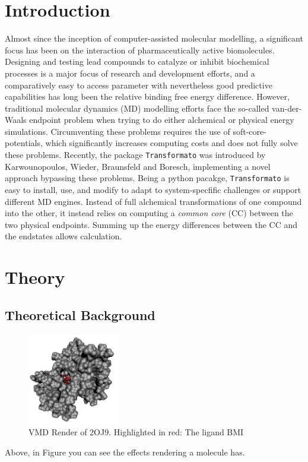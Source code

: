 \documentclass[oneside]{scrreprt}
\begin{document}
\chapter{Introduction}
Almost since the inception of computer-assisted molecular modelling, a significant focus has been on the interaction of pharmaceutically active biomolecules. Designing and testing lead compounds to catalyze or inhibit biochemical processes is a major focus of research and development efforts, and a comparatively easy to access parameter with nevertheless good predictive capabilities has long been the relative binding free energy difference. However, traditional molecular dynamics (MD) modelling efforts face the so-called van-der-Waals endpoint problem when trying to do either alchemical or physical energy simulations. Circumventing these problems requires the use of soft-core-potentials, which significantly increases computing costs and does not fully solve these problems. Recently, the package \texttt{Transformato} was introduced by Karwounopoulos, Wieder, Braunsfeld and Boresch\supercite{Karwou2022Jun,braunsfeldImplementationTestingCHARMM,Wieder2022Jun}, implementing a novel approach bypassing these problems. Being a python pacakge, \texttt{Transformato} is easy to install, use, and modify to adapt to system-specfific challenges or support different MD engines. Instead of full alchemical transformations of one compound into the other, it instead relies on computing a \emph{common core} (CC) between the two physical endpoints. Summing up the energy differences between the CC and the endstates allows calculation. 
\chapter{Theory}

\section{Theoretical Background}



\begin{figure}[h]
\centering
 \includegraphics[height=4cm]{2oj9_render_complex.png} 

\caption{VMD Render of 2OJ9. Highlighted in red: The ligand BMI}
\label{fig:vmdrender}
\end{figure}
Above, in Figure  you can see the effects rendering a molecule has.
\end{document}

